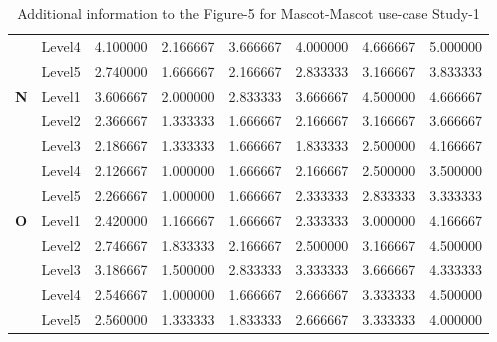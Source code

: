 \begin{table}[H]
\begin{center}
\begin{tabular}{ |p{0.5cm}| p{2cm}|p{1.5cm}|p{1.5cm}| p{1.5cm}|p{1.5cm}|p{1.5cm}| p{1.5cm}| }
&          Level4 & 4.100000 & 2.166667 &3.666667 &4.000000 &4.666667 &5.000000\\
&          Level5 & 2.740000 & 1.666667 &2.166667 &2.833333 &3.166667 &3.833333\\
 \hline 
 \hline 
 \multirow{5}{*}{\textbf{N}} 
&          Level1 & 3.606667 & 2.000000 &2.833333 &3.666667 &4.500000 &4.666667\\
&          Level2 & 2.366667 & 1.333333 &1.666667 &2.166667 &3.166667 &3.666667\\
&          Level3 & 2.186667 & 1.333333 &1.666667 &1.833333 &2.500000 &4.166667\\
&          Level4 & 2.126667 & 1.000000 &1.666667 &2.166667 &2.500000 &3.500000\\
&          Level5 & 2.266667 & 1.000000 &1.666667 &2.333333 &2.833333 &3.333333\\
 \hline 
 \hline 
 \multirow{5}{*}{\textbf{O}} 
&          Level1 & 2.420000 & 1.166667 &1.666667 &2.333333 &3.000000 &4.166667\\
&          Level2 & 2.746667 & 1.833333 &2.166667 &2.500000 &3.166667 &4.500000\\
&          Level3 & 3.186667 & 1.500000 &2.833333 &3.333333 &3.666667 &4.333333\\
&          Level4 & 2.546667 & 1.000000 &1.666667 &2.666667 &3.333333 &4.500000\\
&          Level5 & 2.560000 & 1.333333 &1.833333& 2.666667 &3.333333 &4.000000\\
 \hline 
\end{tabular}
\end{center}
\caption{Additional information to the Figure-5 for Mascot-Mascot use-case Study-1}
\end{table}

